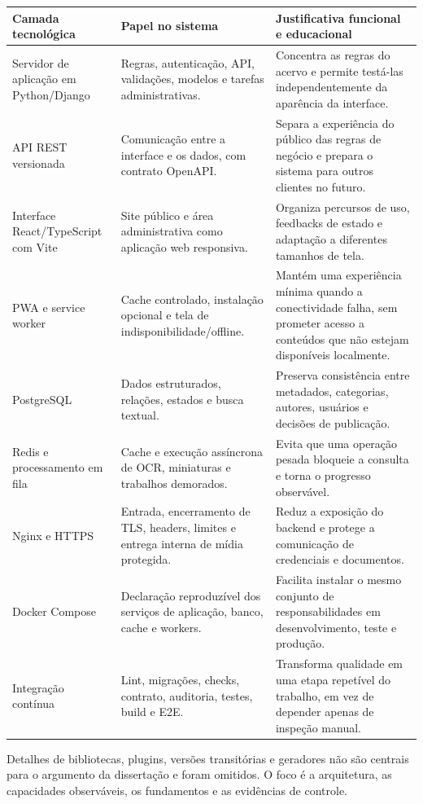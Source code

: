 \documentclass[11pt,a4paper]{article}
\begin{document}
\begin{longtable}{P{0.22\textwidth}P{0.31\textwidth}P{0.37\textwidth}}
\toprule
\textbf{Camada tecnológica} & \textbf{Papel no sistema} & \textbf{Justificativa funcional e educacional} \\
\midrule
\endhead
\bottomrule
\endfoot
Servidor de aplicação em Python/Django & Regras, autenticação, API, validações, modelos e tarefas administrativas. & Concentra as regras do acervo e permite testá-las independentemente da aparência da interface. \\
API REST versionada & Comunicação entre a interface e os dados, com contrato OpenAPI. & Separa a experiência do público das regras de negócio e prepara o sistema para outros clientes no futuro. \\
Interface React/TypeScript com Vite & Site público e área administrativa como aplicação web responsiva. & Organiza percursos de uso, feedbacks de estado e adaptação a diferentes tamanhos de tela. \\
PWA e service worker & Cache controlado, instalação opcional e tela de indisponibilidade/offline. & Mantém uma experiência mínima quando a conectividade falha, sem prometer acesso a conteúdos que não estejam disponíveis localmente. \\
PostgreSQL & Dados estruturados, relações, estados e busca textual. & Preserva consistência entre metadados, categorias, autores, usuários e decisões de publicação. \\
Redis e processamento em fila & Cache e execução assíncrona de OCR, miniaturas e trabalhos demorados. & Evita que uma operação pesada bloqueie a consulta e torna o progresso observável. \\
Nginx e HTTPS & Entrada, encerramento de TLS, headers, limites e entrega interna de mídia protegida. & Reduz a exposição do backend e protege a comunicação de credenciais e documentos. \\
Docker Compose & Declaração reproduzível dos serviços de aplicação, banco, cache e workers. & Facilita instalar o mesmo conjunto de responsabilidades em desenvolvimento, teste e produção. \\
Integração contínua & Lint, migrações, checks, contrato, auditoria, testes, build e E2E. & Transforma qualidade em uma etapa repetível do trabalho, em vez de depender apenas de inspeção manual. \\
\end{longtable}

\begin{quotebox}[title=Recorte tecnológico]
Detalhes de bibliotecas, plugins, versões transitórias e geradores não são centrais para o argumento da dissertação e foram omitidos. O foco é a arquitetura, as capacidades observáveis, os fundamentos e as evidências de controle.
\end{quotebox}
\end{document}
